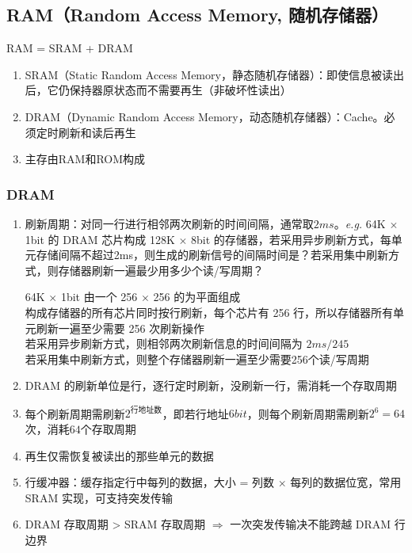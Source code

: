 \documentclass[./computer-organization-and-architecture.tex]{subfiles}
\begin{document}
    \subsection{RAM（Random Access Memory, 随机存储器）}

    RAM = SRAM + DRAM
    \begin{enumerate}
        \item SRAM（Static Random Access Memory，静态随机存储器）：即使信息被读出后，它仍保持器原状态而不需要再生（非破坏性读出）
        \item DRAM（Dynamic Random Access Memory，动态随机存储器）：Cache。必须定时刷新和读后再生
        \item 主存由RAM和ROM构成
    \end{enumerate}

    \subsubsection{DRAM}

    \begin{enumerate}
        \item 刷新周期：对同一行进行相邻两次刷新的时间间隔，通常取$2ms$。\emph{e.g.} 64K $\times$ 1bit 的 DRAM 芯片构成 128K $\times$ 8bit 的存储器，若采用异步刷新方式，每单元存储间隔不超过2ms，则生成的刷新信号的间隔时间是？若采用集中刷新方式，则存储器刷新一遍最少用多少个读/写周期？
        \begin{analysisbox}
            64K $\times$ 1bit 由一个 256 $\times$ 256 的为平面组成 \\
            构成存储器的所有芯片同时按行刷新，每个芯片有 256 行，所以存储器所有单元刷新一遍至少需要 256 次刷新操作 \\
            若采用异步刷新方式，则相邻两次刷新信息的时间间隔为 $2ms/245$ \\
            若采用集中刷新方式，则整个存储器刷新一遍至少需要256个读/写周期
        \end{analysisbox}
        \item DRAM 的刷新单位是行，逐行定时刷新，没刷新一行，需消耗一个存取周期
        \item 每个刷新周期需刷新$2^{\text{行地址数}}$，即若行地址$6bit$，则每个刷新周期需刷新$2^6 = 64$次，消耗$64$个存取周期
        \item 再生仅需恢复被读出的那些单元的数据
        \item 行缓冲器：缓存指定行中每列的数据，大小 = 列数 $\times$ 每列的数据位宽，常用 SRAM 实现，可支持突发传输
        \item DRAM 存取周期 > SRAM 存取周期 $\Rightarrow$ 一次突发传输决不能跨越 DRAM 行边界
    \end{enumerate}
\end{document}

